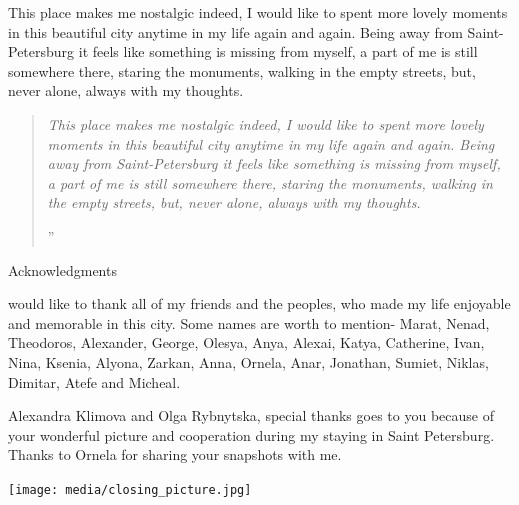 \documentclass[10pt,a4paper]{article} %
\newcommand{\NewsItem}[1]{ %
\usefont{T1}{fvs}{n}{n} %
\vspace{24pt}\large #1\vspace{3pt} %
\par \normalsize \normalfont}
\begin{document}
\begin{multicols}{3}
This place makes me nostalgic indeed, 
I would like to spent more lovely moments in this beautiful city anytime in my life again and again. Being away from Saint-Petersburg it feels like something is missing from myself, a part of me is still somewhere there, staring the monuments, walking in the empty streets, but, never alone, always with my thoughts.




\begin{quotation} %

\noindent\normalsize\textit{This place makes me nostalgic indeed, 
	I would like to spent more lovely moments in this beautiful city anytime in my life again and again. 
	Being away from Saint-Petersburg it feels like something is missing from myself, 
	a part of me is still somewhere there, staring the monuments, 
	walking in the empty streets, but, never alone, always with my thoughts.
}

\hfill{\Huge''}

\end{quotation}

\NewsItem{Acknowledgments}

 would like to thank all of my friends and the peoples, 
 who made my life enjoyable and memorable in this city. 
 Some names are worth to mention- Marat, Nenad, Theodoros, Alexander, George, Olesya, 
 Anya, Alexai, Katya, Catherine, Ivan, Nina, Ksenia, Alyona, Zarkan, Anna, Ornela, 
 Anar, Jonathan, Sumiet, Niklas, Dimitar, Atefe and Micheal.

Alexandra Klimova and Olga Rybnytska, special thanks goes to you because of your 
wonderful picture and cooperation during my staying in Saint Petersburg. 
Thanks to Ornela for sharing your snapshots with me.

\end{multicols}


\begin{center}
	\vspace{10pt}
	\texttt{[image: media/closing\_picture.jpg]} %

	\vspace{10pt}
\end{center}
\end{document}
